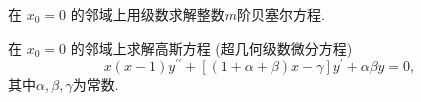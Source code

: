 \documentclass[10pt]{article}
\newenvironment{problem}[2][]{\begin{trivlist}
\item[\hskip \labelsep {\bfseries #1}\hskip \labelsep {\bfseries #2}]}{\end{trivlist}}
\begin{document}
\vspace{2em}

\begin{problem}{8.5}
  在 $x_0=0$ 的邻域上用级数求解整数$m$阶贝塞尔方程.
\end{problem}

\vspace{2em}

\begin{problem}{8.6}
在 $x_0=0$ 的邻域上求解高斯方程 (超几何级数微分方程) 
$$x(x-1) y^{\prime \prime}+[(1+\alpha+\beta) x-\gamma] y^{\prime}+\alpha \beta y=0,$$
其中$\alpha, \beta, \gamma$为常数.
\end{problem} 

\end{document}

